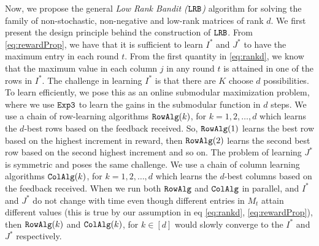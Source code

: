 
Now, we propose the general \emph{Low Rank Bandit (${\tt LRB}$)} algorithm for solving the family of non-stochastic, non-negative and low-rank matrices of rank $d$. We first present the design principle behind the construction of ${\tt LRB}$.  From \eqref{eq:rewardProp}, we have that it is sufficient to learn $I^\ast$ and $J^\ast$ to have the maximum entry in each round $t$. From the first quantity in \eqref{eq:rankd}, we know that the maximum value in each column $j$ in any round $t$ is attained in one of the rows in $I^\ast$. The challenge in learning $I^\ast$ is that there are $K$ choose $d$ possibilities. To learn efficiently, we pose this as an online submodular maximization problem, where we use ${\tt Exp3}$ to learn the gains in the submodular function in $d$ steps. We use a chain of row-learning algorithms ${\tt RowAlg}(k)$, for $k=1,2,\ldots,d$ which learns the $d$-best rows based on the feedback received. So, ${\tt RowAlg}(1)$ learns the best row based on the highest increment in reward, then ${\tt RowAlg}(2)$ learns the second best row based on the second highest increment and so on. The problem of learning $J^\ast$ is symmetric and poses the same challenge. We use a chain of column learning algorithms ${\tt ColAlg}(k)$, for $k=1,2,\ldots,d$ which learns the $d$-best columns based on the feedback received. When we run both ${\tt RowAlg}$ and ${\tt ColAlg}$ in parallel, and $I^\ast$ and $J^\ast$ do not change with time even though different entries in $M_t$ attain different values (this is true by our assumption in eq \eqref{eq:rankd}, \eqref{eq:rewardProp}), then ${\tt RowAlg}(k)$ and ${\tt ColAlg}(k)$, for $k\in [d]$ would slowly converge to the $I^\ast$ and $J^\ast$ respectively.



